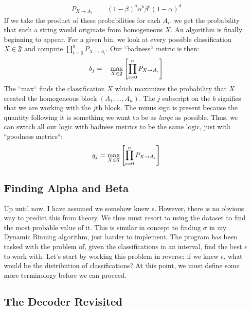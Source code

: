 \documentclass[twocolumn, 12pt]{article}
\begin{document}
\begin{align}
P_{X \to A_{i}} & = \left ( 1 - \beta \right )^{a} \alpha^{b} \beta^{c} \left ( 1 - \alpha \right )^{d} 
\end{align}
If we take the product of these probabilities for each $ A_{i} $, we get the probability that such a string would originate from homogeneous $ X $. 
\newline
\indent An algorithm is finally beginning to appear. For a given bin, we look at every possible classification $ X \in \mathfrak{F} $ and compute $ \prod_{i = 0}^{n} P_{X \to A_{i}} $. Our ``badness`` metric is then:
\begin{align}
b_{j} = - \max_{X \in \frak{F}} \left [ \prod_{i = 0}^{n} P_{X \to A_{i}} \right ]
\end{align}
The ``max`` finds the classification $ X $ which maximizes the probability that $ X $ created the homogeneous block $ \left ( A_{1}, ..., A_{n} \right ) $. The $ j $ subscript on the $ b $ signifies that we are working with the $ j $th block. The minus sign is present because the quantity following it is something we want to be as \textit{large} as possible. Thus, we can switch all our logic with badness metrics to be the same logic, just with ``goodness metrics``:
\begin{align}
g_{j} = \max_{X \in \frak{F}} \left [ \prod_{i = 0}^{n} P_{X \to A_{i}} \right ]
\end{align}
\subsection{Finding Alpha and Beta}
\indent \indent Up until now, I have assumed we somehow knew $ \epsilon $. However, there is no obvious way to predict this from theory. We thus must resort to using the dataset to find the most probable value of it. This is similar in concept to finding $ \sigma $ in my Dynamic Binning algorithm, just harder to implement. 
\newline
\indent The program has been tasked with the problem of, given the classifications in an interval, find the best $ \epsilon $ to work with. Let's start by working this problem in reverse: if we knew $ \epsilon $, what would be the distribution of classifications? At this point, we must define some more terminology before we can proceed. 
\subsection{The Decoder Revisited}
\end{document}
